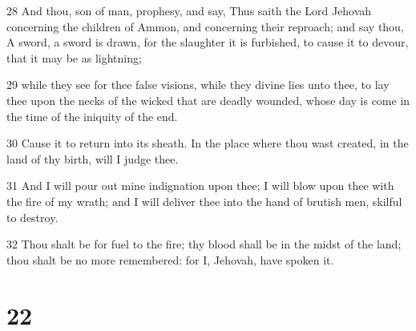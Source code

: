 \par 28 And thou, son of man, prophesy, and say, Thus saith the Lord Jehovah concerning the children of Ammon, and concerning their reproach; and say thou, A sword, a sword is drawn, for the slaughter it is furbished, to cause it to devour, that it may be as lightning;
\par 29 while they see for thee false visions, while they divine lies unto thee, to lay thee upon the necks of the wicked that are deadly wounded, whose day is come in the time of the iniquity of the end.
\par 30 Cause it to return into its sheath. In the place where thou wast created, in the land of thy birth, will I judge thee.
\par 31 And I will pour out mine indignation upon thee; I will blow upon thee with the fire of my wrath; and I will deliver thee into the hand of brutish men, skilful to destroy.
\par 32 Thou shalt be for fuel to the fire; thy blood shall be in the midst of the land; thou shalt be no more remembered: for I, Jehovah, have spoken it.

\chapter{22}

